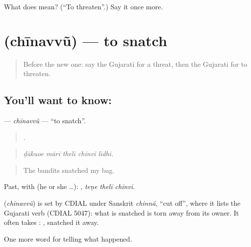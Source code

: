 \begin{tcolorbox}[breakable,colback=teal!4,colframe=teal!35!black,title={Before you move on}]
What does  mean? (\textquotedblleft{}To threaten\textquotedblright{}.) Say it once more.
\end{tcolorbox}
\section[\texorpdfstring{\gu{છીનવવું} (chīnavvũ)}{છીનવવું (chīnavvũ)}]{ (chīnavvũ) — to snatch}

\label{lesson:GU-C290-chinavvu}



\begin{quote}
Before the new one: say the Gujarati for a threat, then the Gujarati for to threaten.
\end{quote}

\subsection*{You'll want to know: }
\textbf{} — \emph{chīnavvũ} — \textquotedblleft{}to snatch\textquotedblright{}.

\begin{quote}
    .
\end{quote}

\begin{quote}
\emph{ḍākuoe mārī thelī chīnvī līdhī.}
\end{quote}

\begin{quote}
The bandits snatched my bag.
\end{quote}

Past, with  (he or she …):   , \emph{teṇe thelī chīnvī}.

\begin{cousinweb}
\textbf{} (\emph{chīnavvũ}) is set by CDIAL under Sanskrit \emph{chinná}, \textquotedblleft{}cut off\textquotedblright{}, where it lists the Gujarati verb (CDIAL 5047): what is snatched is torn away from its owner. It often takes \textbf{}: \textbf{ }, snatched it away.
\end{cousinweb}

\begin{grammarlens}[title={What you've built}]
One more word for telling what happened.
\end{grammarlens}

